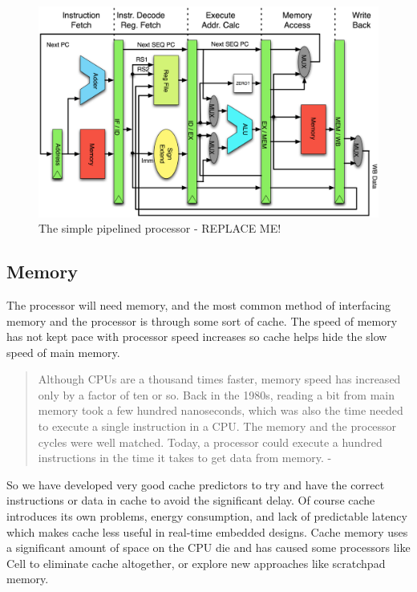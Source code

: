 \documentclass[12pt,twoside,letterpaper]{article}
\begin{document}
\begin{figure}
	\begin{center}
		\includegraphics[scale=.15]{pipeline_MIPS.eps}
	\end{center}
	
	\caption{The simple pipelined processor - REPLACE ME!}
	\label{mips_pipeline}
\end{figure}

\subsection*{Memory}
The processor will need memory, and the most common method of interfacing memory and the processor is through some sort of cache. The speed of memory has not kept pace with processor speed increases so cache helps hide the slow speed of main memory.  

\begin{quote}
Although CPUs are a thousand times faster, memory speed has increased only by a factor of ten or so. Back in the 1980s, reading a bit from main memory took a few hundred nanoseconds, which was also the time needed to execute a single instruction in a CPU. The memory and the processor cycles were well matched. Today, a processor could execute a hundred instructions in the time it takes to get data from memory. - \cite{Hayes:2007p4}
\end{quote}

So we have developed very good cache predictors to try and have the correct instructions or data in cache to avoid the significant delay. Of course cache introduces its own problems, energy consumption, and lack of predictable latency which makes cache less useful in real-time embedded designs. Cache memory uses a significant amount of space on the CPU die and has caused some processors like Cell to eliminate cache altogether, or explore new approaches like scratchpad memory.
\end{document}
